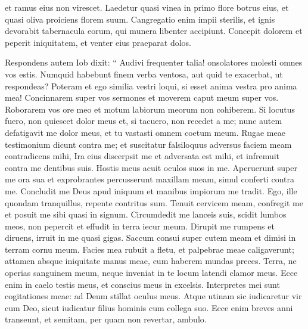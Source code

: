 \begin{biblechapter}
\begin{biblechapter}
\begin{biblechapter}
\begin{biblechapter}
\begin{biblechapter}
\begin{biblechapter}
\begin{biblechapter}
\begin{biblechapter}
\begin{biblechapter}
\begin{biblechapter}
\begin{biblechapter}
\begin{biblechapter}
\begin{biblechapter}
\begin{biblechapter}
\begin{biblechapter}
 et ramus eius non virescet.
 \verse Laedetur quasi vinea in primo flore botrus eius,
 et quasi oliva proiciens florem suum.
 \verse Cangregatio enim impii sterilis,
 et ignis devorabit tabernacula eorum, qui munera libenter accipiunt.
 \verse Concepit dolorem et peperit iniquitatem,
 et venter eius praeparat dolos.
 
\begin{biblechapter}
\verse Respondens autem Iob dixit:
 \verse “ Audivi frequenter talia!
 onsolatores molesti omnes vos estis.
 \verse Numquid habebunt finem verba ventosa,
 aut quid te exacerbat, ut respondeas?
 \verse Poteram et ego similia vestri loqui,
 si esset anima vestra pro anima mea!
 Concinnarem super vos sermones
 et moverem caput meum super vos.
 \verse Roborarem vos ore meo
 et motum labiorum meorum non cohiberem.
 \verse Si locutus fuero, non quiescet dolor meus
 et, si tacuero, non recedet a me;
 \verse nunc autem defatigavit me dolor meus,
 et tu vastasti omnem coetum meum.
 \verse Rugae meae testimonium dicunt contra me;
 et suscitatur falsiloquus adversus faciem meam contradicens mihi,
 \verse Ira eius discerpsit me et adversata est mihi,
 et infremuit contra me dentibus suis.
 Hostis meus acuit oculos suos in me.
 \verse Aperuerunt super me ora sua
 et exprobrantes percusserunt maxillam meam,
 simul conferti contra me.
 \verse Concludit me Deus apud iniquum
 et manibus impiorum me tradit.
 \verse Ego, ille quondam tranquillus, repente contritus sum.
 Tenuit cervicem meam, confregit me
 et posuit me sibi quasi in signum.
 \verse Circumdedit me lanceis suis,
 scidit lumbos meos, non pepercit
 et effudit in terra iecur meum.
 \verse Dirupit me rumpens et diruens,
 irruit in me quasi gigas.
 \verse Saccum consui super cutem meam
 et dimisi in terram cornu meum.
 \verse Facies mea rubuit a fletu,
 et palpebrae meae caligaverunt;
 \verse attamen absque iniquitate manus meae,
 cum haberem mundas preces.
 \verse Terra, ne operias sanguinem meum,
 neque inveniat in te locum latendi clamor meus.
 \verse Ecce enim in caelo testis meus,
 et conscius meus in excelsis.
 \verse Interpretes mei sunt cogitationes meae:
 ad Deum stillat oculus meus.
 \verse Atque utinam sic iudicaretur vir cum Deo,
 sicut iudicatur filius hominis cum collega suo.
 \verse Ecce enim breves anni transeunt,
 et semitam, per quam non revertar, ambulo.
 

\end{biblechapter}
\end{biblechapter}
\end{biblechapter}
\end{biblechapter}
\end{biblechapter}
\end{biblechapter}
\end{biblechapter}
\end{biblechapter}
\end{biblechapter}
\end{biblechapter}
\end{biblechapter}
\end{biblechapter}
\end{biblechapter}
\end{biblechapter}
\end{biblechapter}
\end{biblechapter}
